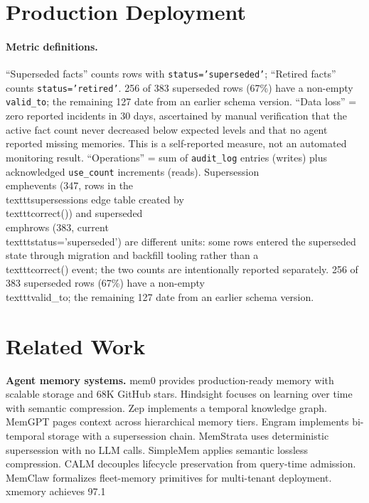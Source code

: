 \documentclass[sigconf,nonacm]{acmart}
\begin{document}
\section{Production Deployment}
\label{sec:production}

\paragraph{Metric definitions.}
``Superseded facts'' counts rows with \texttt{status='superseded'}; ``Retired facts'' counts \texttt{status='retired'}. 256 of 383 superseded rows (67\%) have a non-empty \texttt{valid\_to}; the remaining 127 date from an earlier schema version. ``Data loss'' = zero reported incidents in 30 days, ascertained by manual verification that the active fact count never decreased below expected levels and that no agent reported missing memories. This is a self-reported measure, not an automated monitoring result. ``Operations'' = sum of \texttt{audit\_log} entries (writes) plus acknowledged \texttt{use\_count} increments (reads).
Supersession \\emph{events} (347, rows in the \\texttt{supersessions} edge table created by \\texttt{correct()}) and superseded \\emph{rows} (383, current \\texttt{status='superseded'}) are different units: some rows entered the superseded state through migration and backfill tooling rather than a \\texttt{correct()} event; the two counts are intentionally reported separately. 256 of 383 superseded rows (67\%) have a non-empty \\texttt{valid\_to}; the remaining 127 date from an earlier schema version.

\section{Related Work}
\label{sec:related}

\textbf{Agent memory systems.} mem0 provides production-ready memory with scalable storage and 68K GitHub stars. Hindsight focuses on learning over time with semantic compression. Zep implements a temporal knowledge graph. MemGPT pages context across hierarchical memory tiers. Engram implements bi-temporal storage with a supersession chain. MemStrata uses deterministic supersession with no LLM calls. SimpleMem applies semantic lossless compression. CALM decouples lifecycle preservation from query-time admission. MemClaw formalizes fleet-memory primitives for multi-tenant deployment. xmemory achieves 97.1%
\end{document}
